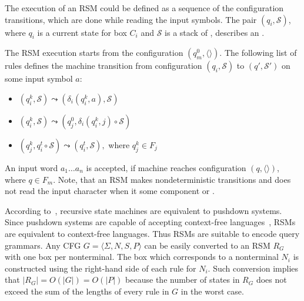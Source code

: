The execution of an RSM could be defined as a sequence of the configuration transitions, which are done while reading the input symbols.
The pair $(q_i,\mathcal{S})$, where $q_i$ is a current state for box $C_i$ and $\mathcal{S}$ is  a stack of , describes an .

The RSM execution starts from the configuration $(q_m^0, \langle\rangle)$.
The following list of rules defines the machine transition from configuration $(q_i,\mathcal{S})$ to $(q',\mathcal{S}')$ on some input symbol $a$:

\begin{itemize}
    \item $(q_i^k,\mathcal{S}) \leadsto (\delta_i (q_i^k, a),\mathcal{S})$
    \item $(q_i^k,\mathcal{S}) \leadsto (q_j^0, \delta_i (q_i^k, j) \circ\mathcal{S})$
    \item $(q_j^k,q_i^t\circ \mathcal{S}) \leadsto (q_i^t, \mathcal{S}),$ where $q_j^k \in F_j$
\end{itemize}

An input word $a_1 \dots a_n$ is accepted, if machine reaches configuration $(q,\langle\rangle)$, where $q \in F_m$.
Note, that an RSM makes nondeterministic transitions and does not read the input character when it  some component or .

According to~\cite{rsm:analysis:10.1007/3-540-44585-4_18}, recursive state machines are equivalent to pushdown systems.
Since pushdown systems are capable of accepting context-free languages~\cite{automata:theory:10.5555/1177300}, RSMs are equivalent to context-free languages.
Thus RSMs are suitable to encode query grammars.
Any CFG $G=\langle\Sigma, N, S, P\rangle$ can be easily converted to an RSM $R_G$ with one box per nonterminal.
The box which corresponds to a nonterminal $N_i$ is constructed using the right-hand side of each rule for $N_i$.
Such conversion implies that $|R_G| = O(|G|) = O(|P|)$ because the number of states in $R_G$ does not exceed the sum of the lengths of every rule in $G$ in the worst case.

